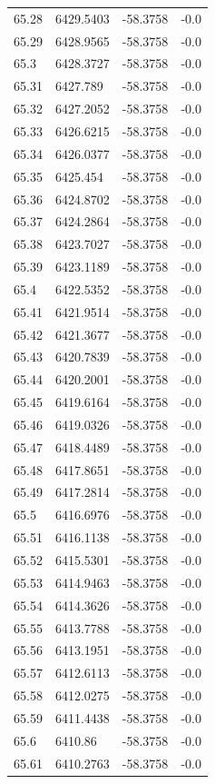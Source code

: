 \begin{table}[H]
\begin{tabular}{llll}
65.28 & 6429.5403 & -58.3758 & -0.0 \\
65.29 & 6428.9565 & -58.3758 & -0.0 \\
65.3 & 6428.3727 & -58.3758 & -0.0 \\
65.31 & 6427.789 & -58.3758 & -0.0 \\
65.32 & 6427.2052 & -58.3758 & -0.0 \\
65.33 & 6426.6215 & -58.3758 & -0.0 \\
65.34 & 6426.0377 & -58.3758 & -0.0 \\
65.35 & 6425.454 & -58.3758 & -0.0 \\
65.36 & 6424.8702 & -58.3758 & -0.0 \\
65.37 & 6424.2864 & -58.3758 & -0.0 \\
65.38 & 6423.7027 & -58.3758 & -0.0 \\
65.39 & 6423.1189 & -58.3758 & -0.0 \\
65.4 & 6422.5352 & -58.3758 & -0.0 \\
65.41 & 6421.9514 & -58.3758 & -0.0 \\
65.42 & 6421.3677 & -58.3758 & -0.0 \\
65.43 & 6420.7839 & -58.3758 & -0.0 \\
65.44 & 6420.2001 & -58.3758 & -0.0 \\
65.45 & 6419.6164 & -58.3758 & -0.0 \\
65.46 & 6419.0326 & -58.3758 & -0.0 \\
65.47 & 6418.4489 & -58.3758 & -0.0 \\
65.48 & 6417.8651 & -58.3758 & -0.0 \\
65.49 & 6417.2814 & -58.3758 & -0.0 \\
65.5 & 6416.6976 & -58.3758 & -0.0 \\
65.51 & 6416.1138 & -58.3758 & -0.0 \\
65.52 & 6415.5301 & -58.3758 & -0.0 \\
65.53 & 6414.9463 & -58.3758 & -0.0 \\
65.54 & 6414.3626 & -58.3758 & -0.0 \\
65.55 & 6413.7788 & -58.3758 & -0.0 \\
65.56 & 6413.1951 & -58.3758 & -0.0 \\
65.57 & 6412.6113 & -58.3758 & -0.0 \\
65.58 & 6412.0275 & -58.3758 & -0.0 \\
65.59 & 6411.4438 & -58.3758 & -0.0 \\
65.6 & 6410.86 & -58.3758 & -0.0 \\
65.61 & 6410.2763 & -58.3758 & -0.0 \\

\end{tabular}
\end{table}
